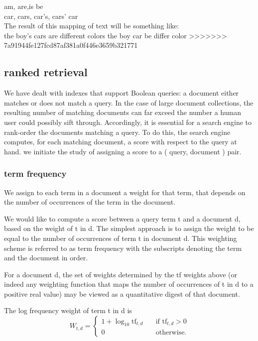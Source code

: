 \begin{itemize}
    am, are,is \Rightarrow  be \\
    
    car, cars, car’s, cars’ \Rightarrow  car \\
      
    
    The result of this mapping of text will be something like:\\
      
    
    the boy’s cars are different colors  \Rightarrow   the  boy  car  be  differ   color
>>>>>>> 7a91944fe127fcd87af381a0f446e3659b321771
      
      
\end{itemize} 

\subsection{ranked retrieval}

We have dealt with indexes that support Boolean queries: a document
either matches or does not match a query. In the case of large document
collections, the resulting number of matching documents can far exceed the
number a human user could possibly sift through. Accordingly, it is essential
for a search engine to rank-order the documents matching a query. 
To do this, the search engine computes, for each matching document, a score with
respect to the query at hand. 
we initiate the study of assigning a score to a ( query, document ) pair.

\subsubsection{term frequency}

We assign to each term in a document a weight for that term, that depends on the number of occurrences of the term in the document.

We would like to compute a score between a query term t and a document d, based on the weight of t in d. The simplest approach is to assign the weight to be equal to the number of occurrences of term t in document d.
This weighting scheme is referred to as term frequency with the subscripts denoting the term and the document in order.

For a document d, the set of weights determined by the tf weights above
(or indeed any weighting function that maps the number of occurrences of t
in d to a positive real value) may be viewed as a quantitative digest of that
document.


The log frequency weight of term t in d is\\
\begin{equation}
    W_{t,d} =\begin{cases} 
   1+\log_{10}\text{tf}_{t,d} &\quad \text{if  }\text{tf}_{t,d} > 0  \\ 0  &\quad  \text{otherwise.} \end{cases}
\end{equation}
  
